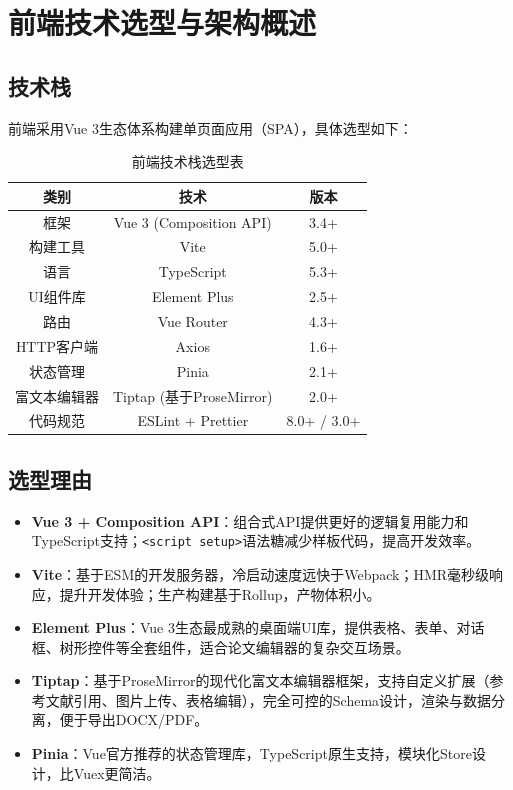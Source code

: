 \documentclass{../softeng}
\begin{document}
\section{前端技术选型与架构概述}

\subsection{技术栈}

前端采用Vue 3生态体系构建单页面应用（SPA），具体选型如下：

\begin{table}[htbp]
    \centering
    \caption{前端技术栈选型表}
    \begin{tabular}{|c|c|c|}
        \hline
        \textbf{类别} & \textbf{技术} & \textbf{版本} \\
        \hline
        框架 & Vue 3 (Composition API) & 3.4+ \\
        \hline
        构建工具 & Vite & 5.0+ \\
        \hline
        语言 & TypeScript & 5.3+ \\
        \hline
        UI组件库 & Element Plus & 2.5+ \\
        \hline
        路由 & Vue Router & 4.3+ \\
        \hline
        HTTP客户端 & Axios & 1.6+ \\
        \hline
        状态管理 & Pinia & 2.1+ \\
        \hline
        富文本编辑器 & Tiptap (基于ProseMirror) & 2.0+ \\
        \hline
        代码规范 & ESLint + Prettier & 8.0+ / 3.0+ \\
        \hline
    \end{tabular}
\end{table}

\subsection{选型理由}

\begin{itemize}
    \item \textbf{Vue 3 + Composition API}：组合式API提供更好的逻辑复用能力和TypeScript支持；\texttt{<script setup>}语法糖减少样板代码，提高开发效率。
    \item \textbf{Vite}：基于ESM的开发服务器，冷启动速度远快于Webpack；HMR毫秒级响应，提升开发体验；生产构建基于Rollup，产物体积小。
    \item \textbf{Element Plus}：Vue 3生态最成熟的桌面端UI库，提供表格、表单、对话框、树形控件等全套组件，适合论文编辑器的复杂交互场景。
    \item \textbf{Tiptap}：基于ProseMirror的现代化富文本编辑器框架，支持自定义扩展（参考文献引用、图片上传、表格编辑），完全可控的Schema设计，渲染与数据分离，便于导出DOCX/PDF。
    \item \textbf{Pinia}：Vue官方推荐的状态管理库，TypeScript原生支持，模块化Store设计，比Vuex更简洁。
\end{itemize}
\end{document}
